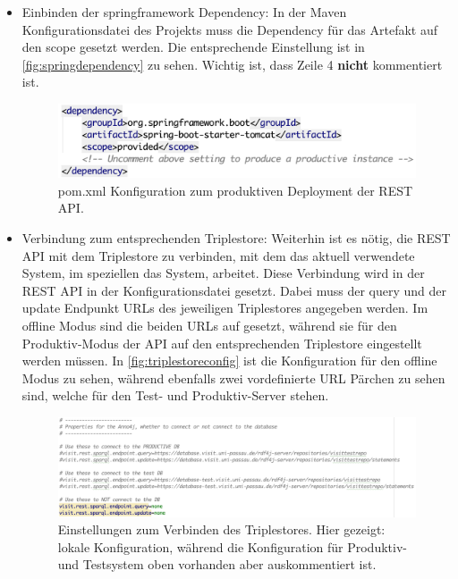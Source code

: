 \begin{itemize}
	\item Einbinden der springframework Dependency: In der \texttt{} Maven Konfigurationsdatei des Projekts muss die Dependency für das Artefakt \texttt{} auf den scope \texttt{} gesetzt werden. Die entsprechende Einstellung ist in \autoref{fig:springdependency} zu sehen. Wichtig ist, dass Zeile 4 \textbf{nicht} kommentiert ist.
	
	\begin{figure}[htb]
    	\centering
	    \includegraphics[width=\textwidth]{Figures/berndl/springDependency}
    	\caption{\label{fig:springdependency} pom.xml Konfiguration zum produktiven Deployment der REST API.}
	\end{figure}
	
	\item Verbindung zum entsprechenden Triplestore: Weiterhin ist es nötig, die REST API mit dem Triplestore zu verbinden, mit dem das aktuell verwendete System, im speziellen das \wisski System, arbeitet. Diese Verbindung wird in der REST API in der Konfigurationsdatei \texttt{} gesetzt. Dabei muss der query und der update Endpunkt URLs des jeweiligen Triplestores angegeben werden. Im offline Modus sind die beiden URLs auf \texttt{} gesetzt, während sie für den Produktiv-Modus der API auf den entsprechenden Triplestore eingestellt werden müssen. In \autoref{fig:triplestoreconfig} ist die Konfiguration für den offline Modus zu sehen, während ebenfalls zwei vordefinierte URL Pärchen zu sehen sind, welche für den \visit Test- und Produktiv-Server stehen.
	
	\begin{figure}[htb]
    	\centering
	    \includegraphics[width=\textwidth]{Figures/berndl/triplestoreConfig}
    	\caption{\label{fig:triplestoreconfig} Einstellungen zum Verbinden des Triplestores. Hier gezeigt: lokale Konfiguration, während die Konfiguration für Produktiv- und Testsystem oben vorhanden aber auskommentiert ist.}
	\end{figure}
\end{itemize}


